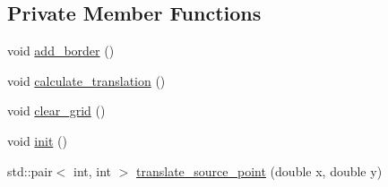\subsection*{Private Member Functions}
\begin{DoxyCompactItemize}
\item 
void \hyperlink{classAsteroids_1_1UI_1_1ClientTextUI_1_1DisplayGrid_a8c7048980c9b3443b5cfa20dd16c6935}{add\+\_\+border} ()
\item 
void \hyperlink{classAsteroids_1_1UI_1_1ClientTextUI_1_1DisplayGrid_aba2b6b3d0cef0cff63f709207652cf44}{calculate\+\_\+translation} ()
\item 
void \hyperlink{classAsteroids_1_1UI_1_1ClientTextUI_1_1DisplayGrid_aa5b4f98a3eae7f672021228e5f484f54}{clear\+\_\+grid} ()
\item 
void \hyperlink{classAsteroids_1_1UI_1_1ClientTextUI_1_1DisplayGrid_a56b4a0b5f6d69ac13c3c7212db3e77b0}{init} ()
\item 
std\+::pair$<$ int, int $>$ \hyperlink{classAsteroids_1_1UI_1_1ClientTextUI_1_1DisplayGrid_ae831e34de9c3fe439b09ed2543e30dee}{translate\+\_\+source\+\_\+point} (double x, double y)
\end{DoxyCompactItemize}
